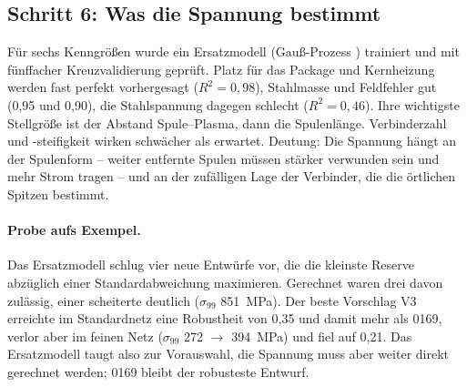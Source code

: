 
\subsection*{Schritt 6: Was die Spannung bestimmt}
Für sechs Kenngrößen wurde ein Ersatzmodell (Gauß-Prozess \cite{rasmussen2006}) trainiert und mit fünffacher
Kreuzvalidierung geprüft. Platz für das Package und Kernheizung werden fast perfekt vorhergesagt ($R^2=0{,}98$),
Stahlmasse und Feldfehler gut (0,95 und 0,90), die Stahlspannung dagegen schlecht ($R^2=0{,}46$). Ihre wichtigste
Stellgröße ist der Abstand Spule--Plasma, dann die Spulenlänge. Verbinderzahl und -steifigkeit wirken schwächer als
erwartet. Deutung: Die Spannung hängt an der Spulenform -- weiter entfernte Spulen müssen stärker verwunden sein und
mehr Strom tragen -- und an der zufälligen Lage der Verbinder, die die örtlichen Spitzen bestimmt.

\paragraph{Probe aufs Exempel.} Das Ersatzmodell schlug vier neue Entwürfe vor, die die kleinste Reserve abzüglich
einer Standardabweichung maximieren. Gerechnet waren drei davon zulässig, einer scheiterte deutlich ($\sigma_{99}$
\SI{851}{MPa}). Der beste Vorschlag V3 erreichte im Standardnetz eine Robustheit von 0,35 und damit mehr als 0169,
verlor aber im feinen Netz ($\sigma_{99}$ \SI{272}{} $\to$ \SI{394}{MPa}) und fiel auf 0,21. Das Ersatzmodell
taugt also zur Vorauswahl, die Spannung muss aber weiter direkt gerechnet werden; 0169 bleibt der robusteste
Entwurf.

